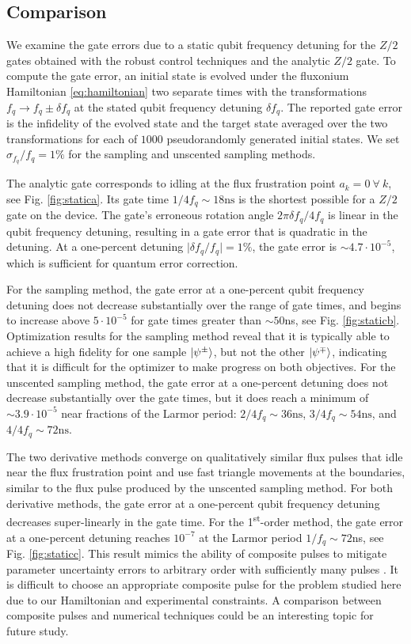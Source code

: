 \documentclass[
  amsfonts,
  amsmath,
  amssymb,
  pra,
  twocolumn,
  superscriptaddress,
]{revtex4-2}
\begin{document}
\subsection{Comparison}
We examine the gate errors due to a static qubit frequency
detuning for the $Z/2$ gates obtained with the robust control techniques
and the analytic $Z/2$ gate.
To compute the gate error,
an initial state is evolved
under the fluxonium Hamiltonian \eqref{eq:hamiltonian}
two separate times with the transformations
$f_{q} \rightarrow f_{q} \pm \delta f_{q}$
at the stated qubit frequency detuning $\delta f_{q}$.
The reported gate error is the infidelity of
the evolved state and the target state averaged over
the two transformations for each of $1000$ pseudorandomly
generated initial states.
We set $\sigma_{f_{q}}/f_{q} = 1\%$
for the sampling and unscented sampling
methods.

The analytic gate corresponds to
idling at the flux frustration point $a_{k} = 0 \ \forall \ k$, see Fig.
\ref{fig:statica}. Its gate time $1 / 4 f_{q} \sim 18\textrm{ns}$
is the shortest possible for a $Z/2$ gate on the device.
The gate's erroneous rotation angle
$2 \pi \delta f_{q} / 4 f_{q}$ is linear in the
qubit frequency detuning, resulting in a gate error that is quadratic
in the detuning.
At a one-percent detuning $\lvert \delta f_{q} / f_{q} \rvert = 1\%$,
the gate error is $\sim 4.7 \cdot 10^{-5}$,
which is sufficient for quantum error correction.

For the sampling method, the gate error at a one-percent qubit frequency detuning
does not decrease substantially over the
range of gate times, and begins to increase above $5 \cdot 10^{-5}$ for gate times
greater than $\sim 50$ns, see Fig. \ref{fig:staticb}.
Optimization results for the sampling method reveal that it is typically
able to achieve a high fidelity for
one sample $\ket{\psi^{\pm}}$,
but not the other $\ket{\psi^{\mp}}$, indicating that it is difficult for the optimizer
to make progress on both objectives.
For the unscented sampling method,
the gate error at a one-percent detuning
does not decrease substantially 
over the gate times, but it does reach
a minimum of $\sim 3.9 \cdot 10^{-5}$
near fractions of the Larmor period: $2/4f_{q} \sim 36\textrm{ns}$,
$3/4f_{q} \sim 54\textrm{ns}$, and $4/4f_{q} \sim 72\textrm{ns}$.

The two derivative methods converge on qualitatively similar flux pulses that
idle near the flux frustration point and use fast triangle movements at the boundaries,
similar to the flux pulse produced by the unscented sampling method.
For both derivative methods, the gate error at a one-percent qubit frequency detuning
decreases super-linearly in the gate time.
For the 1\textsuperscript{st}-order method, the gate error at a one-percent detuning 
reaches $10^{-7}$ at the Larmor period $1 / f_{q} \sim 72$ns,
see Fig. \ref{fig:staticc}.
This result mimics the
ability of composite pulses to mitigate parameter uncertainty errors to arbitrary
order with sufficiently many pulses \cite{merrill2014progress}.
It is difficult to choose an appropriate composite pulse
for the problem studied here due to our Hamiltonian and experimental constraints.
A comparison between composite pulses and numerical techniques could
be an interesting topic for future study.
\end{document}
